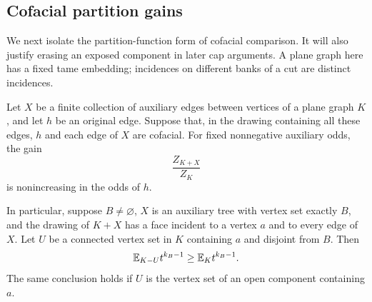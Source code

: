 \subsection{Cofacial partition gains}

We next isolate the partition-function form of cofacial comparison.
It will also justify erasing an exposed component in later cap
arguments. A plane graph here has a fixed tame embedding; incidences
on different banks of a cut are distinct incidences.

\begin{lemma}
\label{pressure:cofacial-gain}
Let $X$ be a finite collection of auxiliary edges between vertices
of a plane graph $K$, and let $h$ be an original edge. Suppose that, in the
drawing containing all these edges, $h$ and each edge of $X$ are
cofacial. For fixed nonnegative auxiliary odds, the gain
\begin{equation}
 \frac{Z_{K+X}}{Z_K}
 \label{pressure:gain}
\end{equation}
is nonincreasing in the odds of $h$.

In particular, suppose $B\ne\varnothing$, $X$ is an auxiliary tree
with vertex set exactly $B$, and the drawing of $K+X$ has a face incident to a
vertex $a$ and to every edge of $X$. Let $U$ be a connected vertex
set in $K$ containing $a$ and disjoint from $B$. Then
\begin{equation}
 \mathbb E_{K-U}t^{k_B-1}\ge\mathbb E_K t^{k_B-1}.
 \label{pressure:erasure-gain}
\end{equation}
The same conclusion holds if $U$ is the vertex set of an open
component containing $a$.
\end{lemma}

